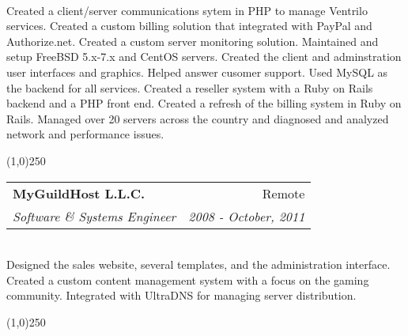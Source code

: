 \documentclass[a4paper,11pt,sans]{article}
\makeatletter
\newcommand{\ressubheading}[4]{
\begin{tabular*}{7.0in}{l@{\extracolsep{\fill}}r}
		\textbf{#1} & #2 \\
		\textit{#3} & \textit{#4} \\
\end{tabular*}\vspace{-6pt}}
\makeatother
\begin{document}
\hspace{5pt} \\

Created a client/server communications sytem in PHP to manage Ventrilo services.
Created a custom billing solution that integrated with PayPal and Authorize.net.
Created a custom server monitoring solution.
Maintained and setup FreeBSD 5.x-7.x and CentOS servers.
Created the client and adminstration user interfaces and graphics.
Helped answer cusomer support.
Used MySQL as the backend for all services.
Created a reseller system with a Ruby on Rails backend and a PHP front end.
Created a refresh of the billing system in Ruby on Rails.
Managed over 20 servers across the country and diagnosed and analyzed network and performance issues.

\begin{center}
  \line(1,0){250}
\end{center}


\ressubheading{MyGuildHost L.L.C.}{Remote}{Software \& Systems Engineer}{2008 - October, 2011}

\hspace{5pt} \\

Designed the sales website, several templates, and the administration interface.
Created a custom content management system with a focus on the gaming community.
Integrated with UltraDNS for managing server distribution.

\begin{center}
  \line(1,0){250}
\end{center}
\end{document}
